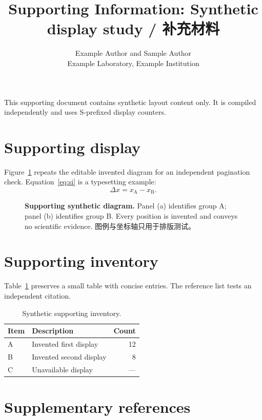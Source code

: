 \documentclass[letterpaper,11pt]{article}
\title{Supporting Information: Synthetic display study / 补充材料}
\author{Example Author and Sample Author\\
  \small Example Laboratory, Example Institution}
\date{}
\begin{document}
\maketitle
This supporting document contains synthetic layout content only. It is
compiled independently and uses S-prefixed display counters.

\section{Supporting display}
Figure~\ref{fig:si-panels} repeats the editable invented diagram for an
independent pagination check. Equation~\eqref{eq:si} is a typesetting example:
\begin{equation}
\Delta x = x_{\mathrm{A}}-x_{\mathrm{B}}.
\label{eq:si}
\end{equation}
\begin{figure}[htbp]
\centering
\resizebox{132mm}{!}{}
\caption{\textbf{Supporting synthetic diagram.} Panel (a) identifies group A;
panel (b) identifies group B. Every position is invented and conveys no
scientific evidence. 图例与坐标轴只用于排版测试。}
\label{fig:si-panels}
\end{figure}

\section{Supporting inventory}
Table~\ref{tab:si-inventory} preserves a small table with concise entries.
The reference list tests an independent citation\cite{wilkinson2016fair}.
\begin{table}[htbp]
\centering\small
\caption{Synthetic supporting inventory.}
\label{tab:si-inventory}
\begin{tabularx}{0.80\linewidth}{@{}lXr@{}}
\toprule Item & Description & Count\\
\midrule
A & Invented first display & 12\\
B & Invented second display & 8\\
C & Unavailable display & ---\\
\bottomrule
\end{tabularx}
\end{table}

\section{Supplementary references}

\end{document}
